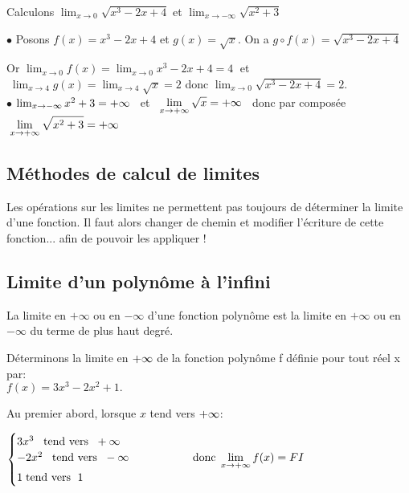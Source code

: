 \begin{example}
 Calculons \quad  $ \displaystyle \lim_{x \to 0} \sqrt{x^{3}-2x+4} $ \; et \; $\displaystyle\lim_{x \to -\infty}\sqrt{x^{2}+3}  $

$ \bullet $  \;  Posons  $ f(x)=x^{3}-2x+4 $ \; et \; $ g(x)=\sqrt{x} $.  \; On a\;  $ g \circ f(x)=  \sqrt{x^{3}-2x+4}  $

Or  $ \displaystyle \lim_{x \to 0}f(x)= \displaystyle\lim_{x \to 0} x^{3}-2x+4=4 \;$   et $\;\displaystyle\lim_{x \to 4}g(x)= \displaystyle \lim_{x \to 4} \sqrt{x}=2 $\; donc\; $  \lim_{x \to 0} \sqrt{x^{3}-2x+4}=2 $.\\
$ \bullet $   $ \lim_{x \to -\infty}x^{2}+3  = +\infty $ ~et~ $\displaystyle  \lim_{x \to +\infty} \sqrt{x} = +\infty $~ donc  par composée $\; \displaystyle\lim_{x \to +\infty}\sqrt{x^{2}+3}=+\infty $
\end{example}

\subsection{ Méthodes de calcul  de limites}
Les opérations sur les limites ne permettent pas toujours de déterminer la limite d'une fonction. Il faut alors changer de chemin et modifier l'écriture de cette fonction... afin de pouvoir les appliquer !
\subsection*{Limite d'un polynôme à l'infini}

\begin{property}
 La limite en $ +\infty $   ou  en $ -\infty $   d'une fonction polynôme est la limite en      $ +\infty $   ou  en $ -\infty $  du terme de plus haut degré.
\end{property}
\begin{example}


Déterminons la limite en $ +\infty  $ de la fonction polynôme f définie pour tout réel x par: \\$ f(x)= 3x^{3}-2x^{2}+1.$
\end{example}



Au premier abord, lorsque $ x $ tend vers $ +\infty $:


$ \begin{cases} 3x^{3}\;\;\;\text{tend vers }\;+\infty  \\
-2x^{2}\;\;\;\text{tend vers } \;-\infty \hspace*{2cm}\text{donc}\;\displaystyle \lim_{x\to +\infty}f(x)=FI\\ 
1\; \text{tend vers }\; 1
 \end{cases}$

